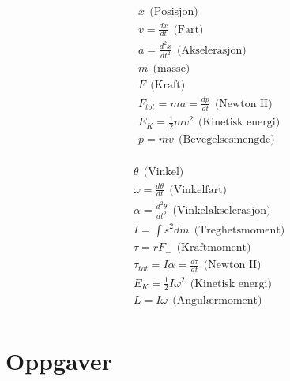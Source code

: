 \documentclass[twoside,utf8]{article}
\begin{document}
\begin{multicols}{2}

\begin{equation*}
\begin{align}
  & x                     \ \     \text{(Posisjon)}      \\
  & v = \frac{dx}{dt}     \ \     \text{(Fart)}          \\
  & a = \frac{d^2x}{dt^2} \ \     \text{(Akselerasjon)}   \\
  & m                     \ \     \text{(masse)}         \\
  & F                     \ \     \text{(Kraft)}         \\
  & F_{tot} = ma = \frac{dp}{dt}    \ \ \text{(Newton II)}       \\
  & E_K = \frac{1}{2}m v^2\ \ \text{(Kinetisk energi)}       \\
  & p = m v               \ \ \text{(Bevegelsesmengde)}       \\
\end{align}
\end{equation*}

\begin{equation*}
\begin{align}
  & \theta                            \ \ \text{(Vinkel)} \\
  & \omega = \frac{d\theta}{dt}       \ \ \text{(Vinkelfart)}        \\
  & \alpha = \frac{d^2\theta}{dt^2}   \ \ \text{(Vinkelakselerasjon)}\\
  & I = \int s^2 dm                   \ \ \text{(Treghetsmoment)}     \\
  & \tau   = r F_\perp                \ \ \text{(Kraftmoment)}       \\
  & \tau_{tot} = I \alpha = \frac{d\tau}{dt} \ \ \text{(Newton II)}       \\
  & E_K = \frac{1}{2}I \omega^2       \ \ \text{(Kinetisk energi)}       \\
  & L = I \omega                      \ \ \text{(Angulærmoment)}       \\
\end{align}
\end{equation*}

\end{multicols}




\newpage




\part*{Oppgaver}
\end{document}
